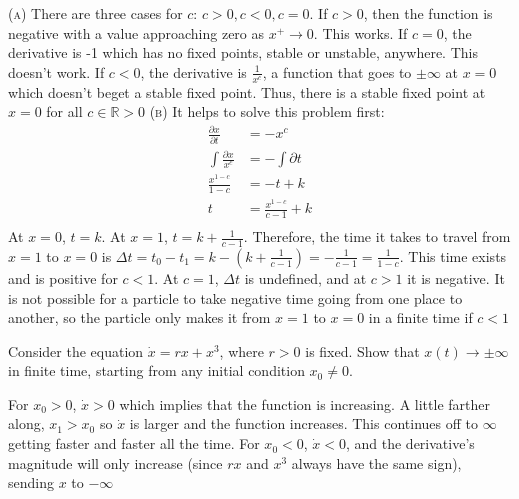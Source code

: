 \documentclass[11pt,answers]{exam}
\begin{document}
\begin{questions}
\begin{solution}
\newline\textsc{(a)} There are three cases for $c$: $c > 0, c < 0, c = 0$.
\newline If $c > 0$, then the function is negative with a value approaching zero as $x^+ \to 0$.  This works.
\newline If $c = 0$, the derivative is -1 which has no fixed points, stable or unstable, anywhere.  This doesn't work.
\newline If $c < 0$, the derivative is $\frac{1}{x^c}$, a function that goes to $\pm\infty$ at $x=0$ which doesn't beget a stable fixed point.
\newline Thus, there is a stable fixed point at $x=0$ for all $c \in \mathbb{R}> 0$
\newline\newline\textsc{(b)} It helps to solve this problem first:
\begin{align*}
\frac{\partial{x}}{\partial{t}} &= -x^c \\
\int \frac{\partial{x}}{x^c} &= -\int\partial{t} \\
\frac{x^{1-c}}{1-c} &= -t + k \\
t &= \frac{x^{1-c}}{c-1} + k \\
\end{align*}
At $x =0$, $t = k$.  At $x = 1$, $t = k + \frac{1}{c-1}$.  Therefore, the time it takes to travel from $x = 1$ to $x = 0$ is $\Delta t = t_0 - t_1 = k - \left( k + \frac{1}{c-1} \right) = -\frac{1}{c-1} = \frac{1}{1-c}$.  This time exists and is positive for $c < 1$.  At $c = 1$, $\Delta t$ is undefined, and at $c > 1$ it is negative.  It is not possible for a particle to take negative time going from one place to another, so the particle only makes it from $x = 1$ to $x = 0$ in a finite time if $ c < 1$
\end{solution}

\item Consider the equation $\dot{x} = rx + x^3$, where $r > 0$ is fixed. Show that $x(t) \to \pm\infty$ in finite time,
starting from any initial condition $x_0 \neq 0$.

\begin{solution}
For $x_0 > 0$, $\dot{x} > 0$ which implies that the function is increasing.  A little farther along, $x_1 > x_0$ so $\dot{x}$ is larger and the function increases.  This continues off to $\infty$ getting faster and faster all the time.
\newline For $x_0 < 0$, $\dot{x} < 0$, and the derivative's magnitude will only increase (since $rx$ and $x^3$ always have the same sign), sending $x$ to $-\infty$
\end{solution}

\end{questions}
\end{document}
